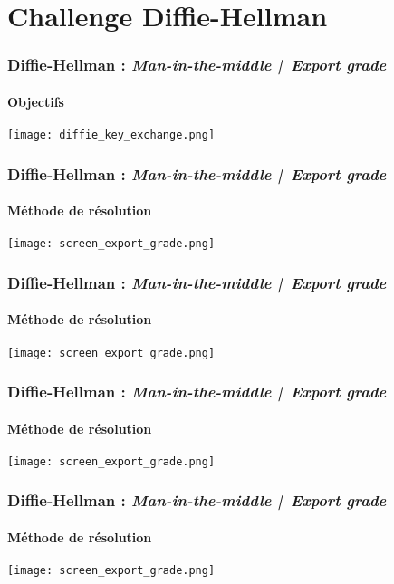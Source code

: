 
\section{Challenge Diffie-Hellman}

\begin{frame}
    \frametitle{Diffie-Hellman : \textit{Man-in-the-middle | Export grade}}
    \framesubtitle{Objectifs}
    \begin{center}
        \texttt{[image: diffie\_key\_exchange.png]}
        \vspace{0.5em}
    \end{center}
\end{frame}

\begin{frame}
    \frametitle{Diffie-Hellman : \textit{Man-in-the-middle | Export grade}}
    \framesubtitle{Méthode de résolution}
    \begin{center}
        \texttt{[image: screen\_export\_grade.png]}
        \vspace{0.5em}
    \end{center}
\end{frame}

\begin{frame}
    \frametitle{Diffie-Hellman : \textit{Man-in-the-middle | Export grade}}
    \framesubtitle{Méthode de résolution}
    \begin{center}
        \texttt{[image: screen\_export\_grade.png]}
        \vspace{0.5em}
    \end{center}
\end{frame}

\begin{frame}
    \frametitle{Diffie-Hellman : \textit{Man-in-the-middle | Export grade}}
    \framesubtitle{Méthode de résolution}
    \begin{center}
        \texttt{[image: screen\_export\_grade.png]}
        \vspace{0.5em}
    \end{center}
\end{frame}

\begin{frame}
    \frametitle{Diffie-Hellman : \textit{Man-in-the-middle | Export grade}}
    \framesubtitle{Méthode de résolution}
    \begin{center}
        \texttt{[image: screen\_export\_grade.png]}
        \vspace{0.5em}
    \end{center}
\end{frame}


